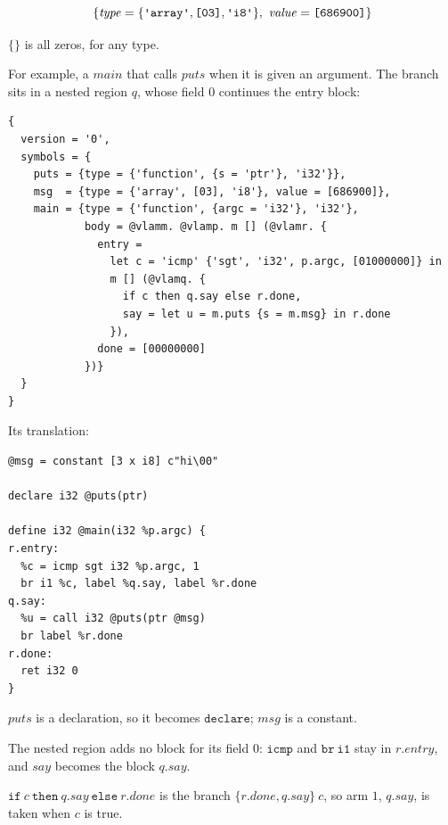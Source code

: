 \documentclass[11pt,letterpaper]{article}
\newcommand{\kw}[1]{\mathtt{#1}}
\newcommand{\str}[1]{\text{\ttfamily\textquotesingle #1\textquotesingle}}  %
\newcommand{\hex}[1]{\text{\ttfamily [#1]}}  %
\newcounter{pt}
\begin{document}
\begin{points}
\begin{subpoints}
    \[\{\mathit{type} = \{\str{array}, \hex{03}, \str{i8}\},\ \mathit{value} = \hex{686900}\}\]
  \item $\{\}$ is all zeros, for any type.
  \end{subpoints}
\item\label{p:example} For example, a $\mathit{main}$ that calls $\mathit{puts}$ when it is given an argument. The branch
  sits in a nested region $q$, whose field $0$ continues the entry block:
  \begin{Verbatim}[commandchars=\@\<\>, xleftmargin=2em]
{
  version = '0',
  symbols = {
    puts = {type = {'function', {s = 'ptr'}, 'i32'}},
    msg  = {type = {'array', [03], 'i8'}, value = [686900]},
    main = {type = {'function', {argc = 'i32'}, 'i32'},
            body = @vlamm. @vlamp. m [] (@vlamr. {
              entry =
                let c = 'icmp' {'sgt', 'i32', p.argc, [01000000]} in
                m [] (@vlamq. {
                  if c then q.say else r.done,
                  say = let u = m.puts {s = m.msg} in r.done
                }),
              done = [00000000]
            })}
  }
}
\end{Verbatim}
  Its translation:
  \begin{Verbatim}[xleftmargin=2em]
@msg = constant [3 x i8] c"hi\00"

declare i32 @puts(ptr)

define i32 @main(i32 %p.argc) {
r.entry:
  %c = icmp sgt i32 %p.argc, 1
  br i1 %c, label %q.say, label %r.done
q.say:
  %u = call i32 @puts(ptr @msg)
  br label %r.done
r.done:
  ret i32 0
}
\end{Verbatim}
  \begin{subpoints}
  \item $\mathit{puts}$ is a declaration, so it becomes $\kw{declare}$; $\mathit{msg}$ is a constant.
  \item The nested region adds no block for its field $0$: $\kw{icmp}$ and $\kw{br\ i1}$ stay in $r.\mathit{entry}$, and $\mathit{say}$
    becomes the block $q.\mathit{say}$.
  \item $\kw{if}\ c\ \kw{then}\ q.\mathit{say}\ \kw{else}\ r.\mathit{done}$ is the branch $\{r.\mathit{done}, q.\mathit{say}\}\ c$, so arm $1$, $q.\mathit{say}$, is
    taken when $c$ is true.
  \end{subpoints}
\end{points}
\end{document}
